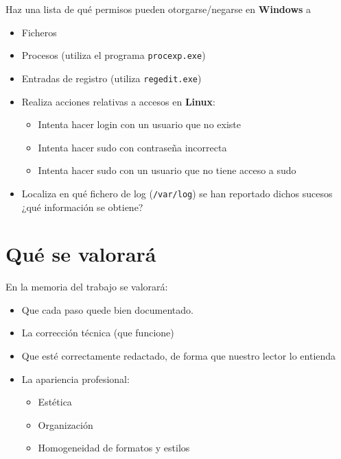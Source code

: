 \begin{homeworkProblem}

  Haz una lista de qué permisos pueden otorgarse/negarse en \textbf{Windows} a

  \begin{itemize}
  \item Ficheros
  \item Procesos (utiliza el programa \texttt{procexp.exe})
  \item Entradas de registro (utiliza \texttt{regedit.exe})
  \end{itemize}
\end{homeworkProblem}

\begin{homeworkProblem}
  \begin{itemize}
  \item Realiza acciones relativas a accesos en \textbf{Linux}:
    
    \begin{itemize}
    \item Intenta hacer login con un usuario que no existe
    \item Intenta hacer sudo con contraseña incorrecta
    \item 	Intenta hacer sudo con un usuario que no tiene acceso a sudo
    \end{itemize}
  \item Localiza en qué fichero de log (\texttt{/var/log}) se han reportado dichos sucesos ¿qué información se obtiene?
  \end{itemize}
\end{homeworkProblem}


\section{Qué se valorará}
En la memoria del trabajo se valorará:
\begin{itemize}
\item Que cada paso quede bien documentado. 
\item La corrección técnica (que funcione)
\item Que esté correctamente redactado, de forma que nuestro lector lo entienda 
\item La apariencia profesional:
  \begin{itemize}
  \item Estética
  \item Organización
  \item Homogeneidad de formatos y estilos
  \end{itemize}
\end{itemize}

